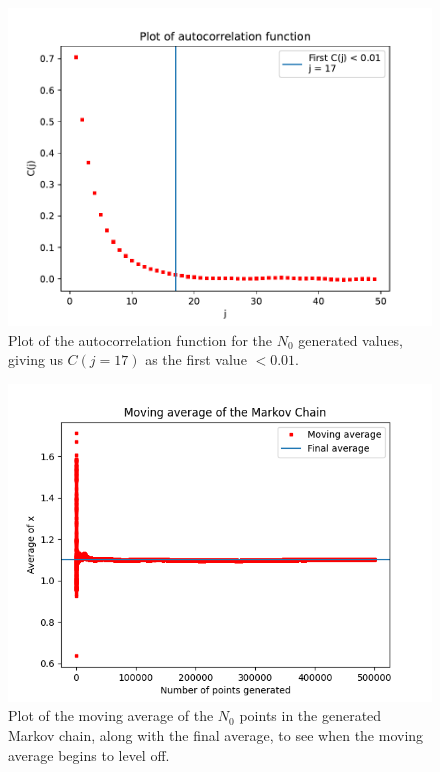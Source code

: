 \documentclass[11pt]{article}
\begin{document}
\begin{enumerate}
\begin{enumerate}
        \begin{figure}[H]
            \begin{center}
                \includegraphics[width=.65\textwidth]{Plots/correlation.pdf}
                \caption{Plot of the autocorrelation function for the $N_0$ generated values, giving us $C(j=17)$ as the first value $< 0.01$. }
                \label{fig:correlation}
            \end{center}
        \end{figure}

        \begin{figure}[H]
            \begin{center}
                \includegraphics[width=.65\textwidth]{Plots/equilibrium.png}
                \caption{Plot of the moving average of the $N_0$ points in the generated Markov chain, along with the final average, to see when the moving average begins to level off.}
                \label{fig:equilibrium}
            \end{center}
        \end{figure}
        

\end{enumerate}
\end{enumerate}
\end{document}
